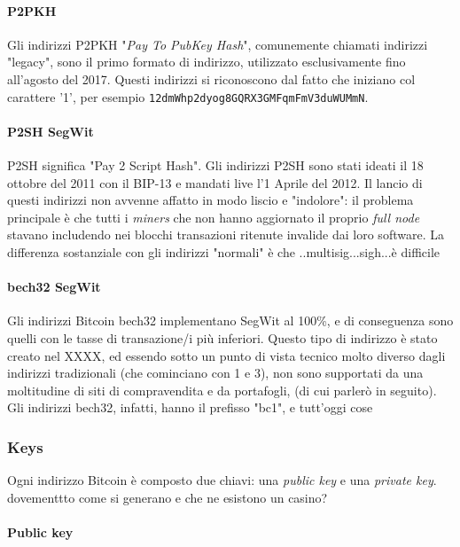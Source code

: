 \documentclass {article}
\begin{document}
\paragraph {P2PKH}

Gli indirizzi P2PKH "\textit{Pay To PubKey Hash}", comunemente chiamati indirizzi "legacy", sono il primo formato di indirizzo, utilizzato esclusivamente fino all'agosto del 2017.
Questi indirizzi si riconoscono dal fatto che iniziano col carattere '1', per esempio \texttt{12dmWhp2dyog8GQRX3GMFqmFmV3duWUMmN}.

\paragraph {P2SH SegWit}

P2SH significa "Pay 2 Script Hash".
Gli indirizzi P2SH sono stati ideati il 18 ottobre del 2011 con il BIP-13 e mandati live l'1 Aprile del 2012.
Il lancio di questi indirizzi non avvenne affatto in modo liscio e "indolore": il problema principale è che tutti i \textit{miners} che non hanno aggiornato il proprio \textit{full node} stavano includendo nei blocchi transazioni ritenute invalide dai loro software.
La differenza sostanziale con gli indirizzi "normali" è che ..multisig...sigh...è difficile

\paragraph {bech32 SegWit}

Gli indirizzi Bitcoin bech32 implementano SegWit al 100\%, e di conseguenza sono quelli con le tasse di transazione/i più inferiori.
Questo tipo di indirizzo è stato creato nel XXXX, ed essendo sotto un punto di vista tecnico molto diverso dagli indirizzi tradizionali (che cominciano con 1 e 3), non sono supportati da una moltitudine di siti di compravendita e da portafogli, (di cui parlerò in seguito).
Gli indirizzi bech32, infatti, hanno il prefisso "bc1", e tutt'oggi cose


\subsubsection {Keys}


Ogni indirizzo Bitcoin è composto due chiavi: una \textit{public key} e una \textit{private key}. dovementtto come si generano e che ne esistono un casino?

\paragraph {Public key}
\end{document}
